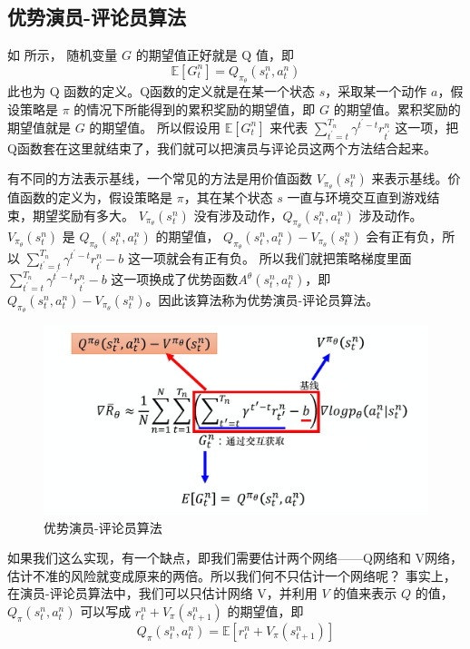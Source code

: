 \subsection{优势演员-评论员算法}
如 所示，
随机变量 $G$ 的期望值正好就是 Q 值，即
\begin{equation}
  \label{eq:}
  \mathbb{E}\left[G_{t}^{n}\right]=Q_{\pi_{\theta}} \left(s_{t}^{n}, a_{t}^{n}\right)
\end{equation}
此也为 Q 函数的定义。Q函数的定义就是在某一个状态 $s$，采取某一个动作 $a$，假设策略是 $\pi$ 的情况下所能得到的累积奖励的期望值，即 $G$ 的期望值。累积奖励的期望值就是 $G$ 的期望值。
所以假设用 $\mathbb{E}\left[G_{t}^{n}\right]$ 来代表 $\sum_{t^{\prime}=t}^{T_{n}} \gamma^{t^{\prime}-t} r_{t^{\prime}}^{n}$ 这一项，把Q函数套在这里就结束了，我们就可以把演员与评论员这两个方法结合起来。

有不同的方法表示基线，一个常见的方法是用价值函数 $V_{\pi_{\theta}}\left(s_{t}^{n}\right)$ 来表示基线。价值函数的定义为，假设策略是 $\pi$，其在某个状态 $s$ 一直与环境交互直到游戏结束，期望奖励有多大。 $V_{\pi_{\theta}}\left(s_{t}^{n}\right)$ 没有涉及动作，$Q_{\pi_{\theta}}\left(s_{t}^{n}, a_{t}^{n}\right)$ 涉及动作。
$V_{\pi_{\theta}}\left(s_{t}^{n}\right)$ 是 $Q_{\pi_{\theta}}\left(s_{t}^{n}, a_{t}^{n}\right)$ 的期望值， $Q_{\pi_{\theta}}\left(s_{t}^{n}, a_{t}^{n}\right)-V_{\pi_{\theta}}\left(s_{t}^{n}\right)$ 会有正有负，所以 $\sum_{t^{\prime}=t}^{T_{n}} \gamma^{t^{\prime}-t} r_{t^{\prime}}^{n}-b$ 这一项就会有正有负。
所以我们就把策略梯度里面 $\sum_{t^{\prime}=t}^{T_{n}} \gamma^{t^{\prime}-t} r_{t^{\prime}}^{n}-b$ 这一项换成了优势函数$A^{\theta}\left(s^{n}_{t}, a^{n}_{t}\right)$，即 $Q_{\pi_{\theta}}\left(s_{t}^{n}, a_{t}^{n}\right)-V_{\pi_{\theta}}\left(s_{t}^{n}\right)$。因此该算法称为优势演员-评论员算法。
\begin{figure}[hbt]
  \centering
  \includegraphics[width=0.5\linewidth]{res/ch9/9.3}
  \caption{优势演员-评论员算法}
  \label{fig:fig9.3}
\end{figure}

如果我们这么实现，有一个缺点，即我们需要估计两个网络------Q网络和 V网络，估计不准的风险就变成原来的两倍。所以我们何不只估计一个网络呢？
事实上，在演员-评论员算法中，我们可以只估计网络 V，并利用 $V$ 的值来表示 $Q$ 的值，$Q_{\pi}\left(s_{t}^{n}, a_{t}^{n}\right)$ 可以写成 $ r_{t}^{n}+V_{\pi}\left(s_{t+1}^{n}\right)$ 的期望值，即
\begin{equation}
  \label{eq:}
  Q_{\pi}\left(s_{t}^{n}, a_{t}^{n}\right)=\mathbb{E}\left[r_{t}^{n}+V_{\pi}\left(s_{t+1}^{n}\right)\right]
\end{equation}

